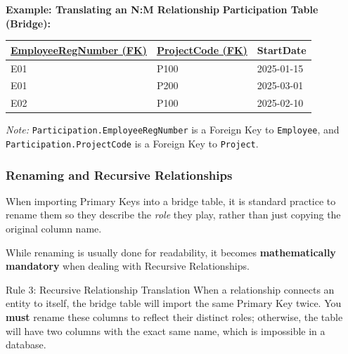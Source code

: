 \begin{example}{\textbf{Example: Translating an N:M Relationship}}
\textbf{Participation Table (Bridge):}
\begin{center}
\begin{tabular}{|l|l|l|}
\hline
\textbf{\underline{EmployeeRegNumber (FK)}} & \textbf{\underline{ProjectCode (FK)}} & \textbf{StartDate} \\
\hline
E01 & P100 & 2025-01-15 \\
E01 & P200 & 2025-03-01 \\
E02 & P100 & 2025-02-10 \\
\hline
\end{tabular}
\end{center}

\vs
\textit{Note:} \texttt{Participation.EmployeeRegNumber} is a Foreign Key to \texttt{Employee}, and \texttt{Participation.ProjectCode} is a Foreign Key to \texttt{Project}.
\end{example}

\subsubsection{Renaming and Recursive Relationships}
When importing Primary Keys into a bridge table, it is standard practice to rename them so they describe the \textit{role} they play, rather than just copying the original column name.

While renaming is usually done for readability, it becomes \textbf{mathematically mandatory} when dealing with Recursive Relationships.

\vs
\begin{defbox}{Rule 3: Recursive Relationship Translation}
When a relationship connects an entity to itself, the bridge table will import the same Primary Key twice. You \textbf{must} rename these columns to reflect their distinct roles; otherwise, the table will have two columns with the exact same name, which is impossible in a database.
\end{defbox}

